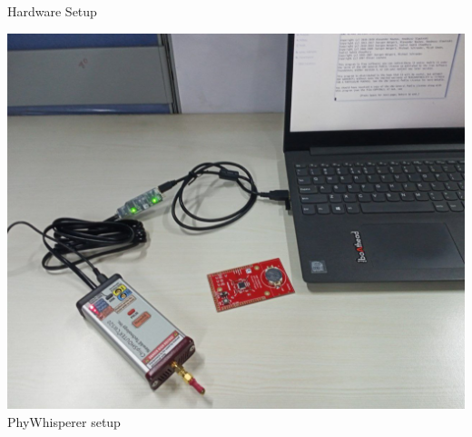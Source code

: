 \documentclass{beamer}
\newenvironment{tres important}[2][]{
	\setkeys{EmphEqEnv}{#2}
	\setkeys{EmphEqOpt}{box={\setlength{\fboxsep}{10pt}\fcolorbox{myNewColorA}{white}},#1}
	\EmphEqMainEnv}
{\endEmphEqMainEnv}
\begin{document}
\begin{frame}{Hardware Setup}
\begin{minipage}[b]{0.3\linewidth}
    \includegraphics[width=\linewidth]{images/phy_hardware.png}
    \smallskip
    PhyWhisperer setup
  \end{minipage}
\end{frame}
\end{document}
